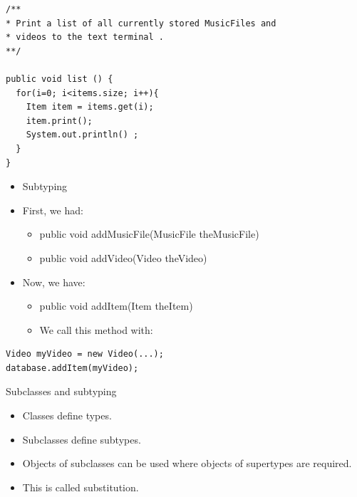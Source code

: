 \documentclass{beamer}
\begin{document}
\begin{frame}[fragile]
\begin{block}{}
\begin{lstlisting}
/**
* Print a list of all currently stored MusicFiles and 
* videos to the text terminal .
**/

public void list () {
  for(i=0; i<items.size; i++){ 
    Item item = items.get(i);
    item.print();
    System.out.println() ;   
  } 
}
\end{lstlisting}
\end{block}
\end{frame}

\begin{frame}[fragile]
\begin{itemize}
\item Subtyping
\bigskip
\item First, we had:
\begin{itemize}
\item public void addMusicFile(MusicFile theMusicFile)
\item public void addVideo(Video theVideo)
\end{itemize}
\item Now, we have:
\begin{itemize}
\item public void addItem(Item theItem)
\item We call this method with:
\end{itemize}
\end{itemize} 

\begin{block}{}
\begin{lstlisting}
Video myVideo = new Video(...);
database.addItem(myVideo);
\end{lstlisting}
\end{block}
\end{frame}

\begin{frame}
Subclasses and subtyping
\begin{itemize}
\item Classes define types.
\item Subclasses define subtypes.
\item Objects of subclasses can be used where objects of supertypes are required.
\item This is called substitution.
\end{itemize}
\end{frame}
\end{document}
